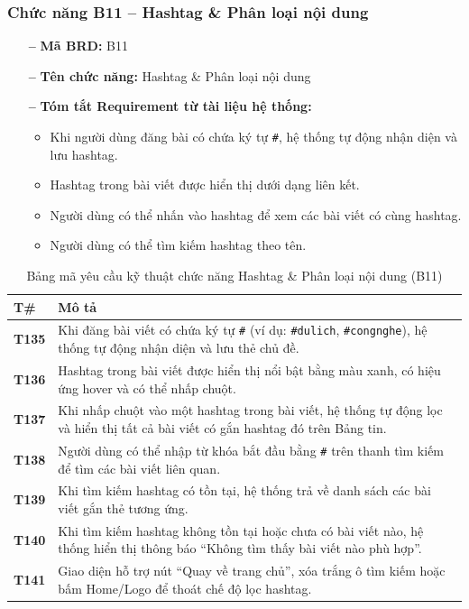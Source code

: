 \documentclass[11pt,a4paper]{article}
\begin{document}
\subsubsection{Chức năng B11 -- Hashtag \& Phân loại nội dung}

\begin{itemize}[leftmargin=1.2cm, noitemsep]
    \item[\textbf{--}] \textbf{Mã BRD:} B11
    \item[\textbf{--}] \textbf{Tên chức năng:} Hashtag \& Phân loại nội dung
    \item[\textbf{--}] \textbf{Tóm tắt Requirement từ tài liệu hệ thống:}
    \begin{itemize}[leftmargin=0.8cm, label=$\bullet$, noitemsep]
        \item Khi người dùng đăng bài có chứa ký tự \texttt{\#}, hệ thống tự động nhận diện và lưu hashtag.
        \item Hashtag trong bài viết được hiển thị dưới dạng liên kết.
        \item Người dùng có thể nhấn vào hashtag để xem các bài viết có cùng hashtag.
        \item Người dùng có thể tìm kiếm hashtag theo tên.
    \end{itemize}
\end{itemize}

\begin{table}[H]
\centering
\small
\begin{tabularx}{\textwidth}{|C{1.5cm}|X|}
\hline
{}
\textbf{T\#} & \textbf{Mô tả} \tabularnewline
\hline
\textbf{T135} & Khi đăng bài viết có chứa ký tự \texttt{\#} (ví dụ: \texttt{\#dulich}, \texttt{\#congnghe}), hệ thống tự động nhận diện và lưu thẻ chủ đề. \\ \hline
\textbf{T136} & Hashtag trong bài viết được hiển thị nổi bật bằng màu xanh, có hiệu ứng hover và có thể nhấp chuột. \\ \hline
\textbf{T137} & Khi nhấp chuột vào một hashtag trong bài viết, hệ thống tự động lọc và hiển thị tất cả bài viết có gắn hashtag đó trên Bảng tin. \\ \hline
\textbf{T138} & Người dùng có thể nhập từ khóa bắt đầu bằng \texttt{\#} trên thanh tìm kiếm để tìm các bài viết liên quan. \\ \hline
\textbf{T139} & Khi tìm kiếm hashtag có tồn tại, hệ thống trả về danh sách các bài viết gắn thẻ tương ứng. \\ \hline
\textbf{T140} & Khi tìm kiếm hashtag không tồn tại hoặc chưa có bài viết nào, hệ thống hiển thị thông báo ``Không tìm thấy bài viết nào phù hợp''. \\ \hline
\textbf{T141} & Giao diện hỗ trợ nút ``Quay về trang chủ'', xóa trắng ô tìm kiếm hoặc bấm Home/Logo để thoát chế độ lọc hashtag. \\ \hline
\end{tabularx}
\caption{Bảng mã yêu cầu kỹ thuật chức năng Hashtag \& Phân loại nội dung (B11)}
\end{table}
\end{document}
